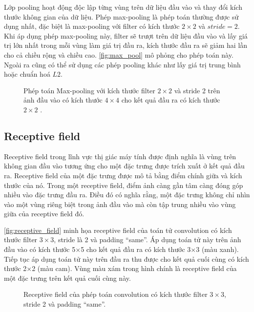	Lớp pooling hoạt động độc lập từng vùng trên dữ liệu đầu vào và thay đổi kích thước không gian của dữ liệu. Phép max-pooling là phép toán thường được sử dụng nhất, đặc biệt là max-pooling với filter có kích thước $2\times 2$ và $stride=2$. Khi áp dụng phép max-pooling này, filter sẽ trượt trên dữ liệu đầu vào và lấy giá trị lớn nhất trong mỗi vùng làm giá trị đầu ra, kích thước đầu ra sẽ giảm hai lần cho cả chiều rộng và chiều cao. \autoref{fig:max_pool} mô phỏng cho phép toán này. Ngoài ra cũng có thể sử dụng các phép pooling khác như lấy giá trị trung bình hoặc chuẩn hoá $L2$.
	\newpage
	\begin{figure}[h!]
		\centering
		
		\caption[Phép toán Max-pooling với kích thước kernel $2\times2$ và stride 2.]{Phép toán Max-pooling với kích thước filter $2\times2$ và stride 2 trên ảnh đầu vào có kích thước $4\times4$ cho kết quả đầu ra có kích thước $2\times2$ .}
		\label{fig:max_pool}
	\end{figure}

\subsection{Receptive field} 
\label{subsec:receptive_field}
	Receptive field trong lĩnh vực thị giác máy tính được định nghĩa là vùng trên không gian đầu vào tương ứng cho một đặc trưng được trích xuất ở kết quả đầu ra. Receptive field của một đặc trưng được mô tả bằng điểm chính giữa và kích thước của nó.  Trong một receptive field, điểm ảnh càng gần tâm càng đóng góp nhiều vào đặc trưng đầu ra. Điều đó có nghĩa rằng, một đặc trưng không chỉ nhìn vào một vùng riêng biệt trong ảnh đầu vào mà còn tập trung nhiều vào vùng giữa của receptive field đó. 
	
	\autoref{fig:receptive_field} minh họa receptive field của toán tử convolution có kích thước filter $3\times3$, stride là 2 và padding ``same''. Áp dụng toán tử này trên ảnh đầu vào có kích thước 5$\times$5 cho kết quả đầu ra có kích thước 3$\times$3 (màu xanh). Tiếp tục áp dụng toán tử này trên đầu ra thu được cho kết quả cuối cùng có kích thước 2$\times$2 (màu cam). Vùng màu xám trong hình chính là receptive field của một đặc trưng trên kết quả cuối cùng này.
	\vfill
	\begin{figure}[h!]
		\centering
		
		\caption[Receptive field của phép toán Convolution có kích thước filter $3\times 3$, stride 2 và padding ``same''.]{Receptive field của phép toán convolution có kích thước filter $3\times 3$, stride 2  và padding ``same''.}
		\label{fig:receptive_field}
	\end{figure}

